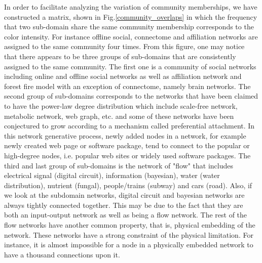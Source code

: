 \documentclass{article}
\begin{document}
In order to facilitate analyzing the variation of community memberships, we have constructed a matrix, shown in Fig.\ref{community_overlaps} in which the frequency that two sub-domain share the same community membership corresponds to the color intensity. For instance offline social, connectome and affiliation networks are assigned to the same community four times. From this figure, one may notice that there appears to be three groups of sub-domains that are consistently assigned to the same community. The first one is a community of social networks including online and offline social networks as well as affiliation network and forest fire model with an exception of connectome, namely brain networks. The second group of sub-domains corresponds to the networks that have been claimed to have the power-law degree distribution which include scale-free network, metabolic network, web graph, etc. and some of these networks have been conjectured to grow according to a mechanism called preferential attachment. In this network generative process, newly added nodes in a network, for example newly created web page or software package, tend to connect to the popular or high-degree nodes, i.e. popular web sites or widely used software packages. The third and last group of sub-domains is the network of "flow" that includes electrical signal (digital circuit), information (bayesian), water (water distribution), nutrient (fungal), people/trains (subway) and cars (road).  Also, if we look at the subdomain networks, digital circuit and bayesian networks are always tightly connected together. This may be due to the fact that they are both an input-output network as well as being a flow network. The rest of the flow networks have another common property, that is, physical embedding of the network. These networks have a strong constraint of the physical limitation. For instance, it is almost impossible for a node in a physically embedded network to have a thousand connections upon it.
\end{document}
